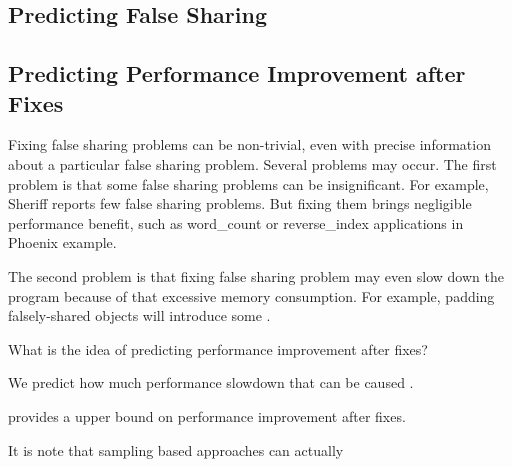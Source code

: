 \subsection{Predicting False Sharing}

\subsection{Predicting Performance Improvement after Fixes}

\label{sec:predictimprove}

Fixing false sharing problems can be non-trivial, even with precise information about a particular false sharing problem. Several problems may occur. 
The first problem is that some false sharing problems can be insignificant. 
For example, Sheriff reports few false sharing problems. But fixing them brings negligible performance benefit, such as word\_count or reverse\_index applications in Phoenix example. 

The second problem is that fixing false sharing problem may even slow down the program because of that excessive memory consumption. For example, padding falsely-shared objects will introduce some . 

What is the idea of predicting performance improvement after fixes?  

We predict how much performance slowdown that can be caused . 

\cheetah{} provides a upper bound on performance improvement after fixes. 

It is note that sampling based approaches can actually 








 